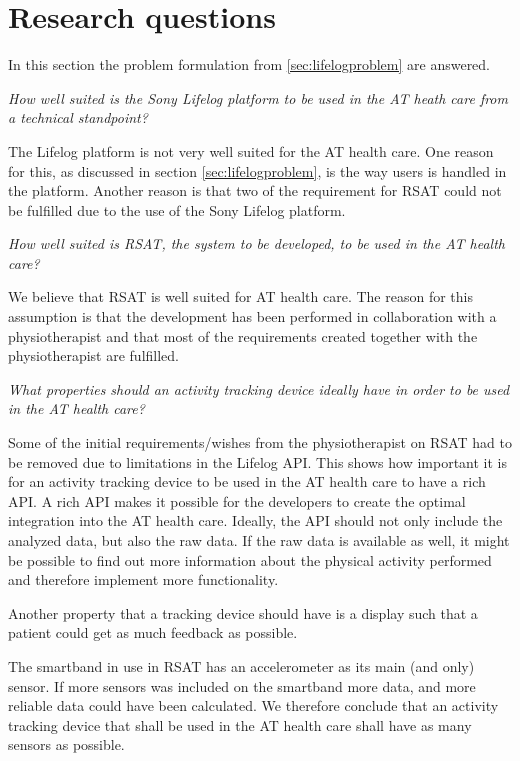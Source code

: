 \documentclass{cslthse-msc}
\begin{document}
\section{Research questions}
In this section the problem formulation from \ref{sec:lifelogproblem} are answered.

\emph{How well suited is the Sony Lifelog platform to be used in the AT heath care from a technical standpoint?}

The Lifelog platform is not very well suited for the AT health care. One reason for this, as discussed in section \ref{sec:lifelogproblem}, is the way users is handled in the platform. Another reason is that two of the requirement for RSAT could not be fulfilled due to the use of the Sony Lifelog platform.  

\emph{How well suited is RSAT, the system to be developed, to be used in the AT health care?} 

We believe that RSAT is well suited for AT health care. The reason for this assumption is that the development has been performed in collaboration with a physiotherapist and that most of the requirements created together with the physiotherapist are fulfilled. 

\emph{What properties should an activity tracking device ideally have in order to be used in the AT health care?} 

Some of the initial requirements/wishes from the physiotherapist on RSAT had to be removed due to limitations in the Lifelog API. This shows how important it is for an activity tracking device to be used in the AT health care to have a rich API. A rich API makes it possible for the developers to create the optimal integration into the AT health care. Ideally, the API should not only include the analyzed data, but also the raw data. If the raw data is available as well, it might be possible to find out more information about the physical activity performed and therefore implement more functionality. 

Another property that a tracking device should have is a display such that a patient could get as much feedback as possible. 

The smartband in use in RSAT has an accelerometer as its main (and only) sensor. If more sensors was included on the smartband more data, and more reliable data could have been calculated. We therefore conclude that an activity tracking device that shall be used in the AT health care shall have as many sensors as possible. 

\end{document}
